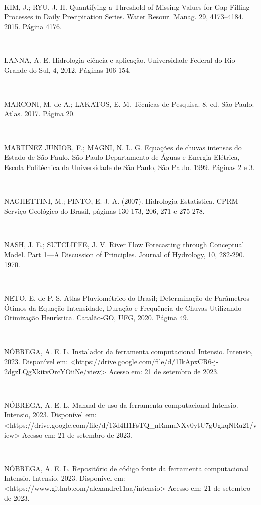 \begin{flushleft}
\

KIM, J.; RYU, J. H. Quantifying a Threshold of Missing Values for Gap Filling Processes in Daily Precipitation Series. Water Resour. Manag. 29, 4173–4184. 2015. Página 4176.

\

LANNA, A. E. Hidrologia ciência e aplicação. Universidade Federal do Rio Grande do Sul, 4, 2012. Páginas 106-154.

\

MARCONI, M. de A.; LAKATOS, E. M. Técnicas de Pesquisa. 8. ed. São Paulo: Atlas. 2017. Página 20.

\

MARTINEZ JUNIOR, F.; MAGNI, N. L. G. Equações de chuvas intensas do Estado de São Paulo. São Paulo Departamento de Águas e Energia Elétrica, Escola Politécnica da Universidade de São Paulo, São Paulo. 1999. Páginas 2 e 3.

\

NAGHETTINI, M.; PINTO, E. J. A. (2007). Hidrologia Estatística. CPRM – Serviço Geológico do Brasil, páginas 130-173, 206, 271 e 275-278.

\

NASH, J. E.; SUTCLIFFE, J. V. River Flow Forecasting through Conceptual Model. Part 1—A Discussion of Principles. Journal of Hydrology, 10, 282-290. 1970.

\

NETO, E. de P. S. Atlas Pluviométrico do Brasil; Determinação de Parâmetros Ótimos da Equação Intensidade, Duração e Frequência de Chuvas Utilizando Otimização Heurística. Catalão-GO, UFG, 2020. Página 49.

\newpage

\

NÓBREGA, A. E. L. Instalador da ferramenta computacional Intensio. Intensio, 2023. Disponível em: <https://drive.google.com/file/d/1IkApxCR6-j-2dgzLQgXkitvOrcYOiiNe/view> Acesso em: 21 de setembro de 2023.

\

NÓBREGA, A. E. L. Manual de uso da ferramenta computacional Intensio. Intensio, 2023. Disponível em: <https://drive.google.com/file/d/13d4H1FsTQ\_nRmmNXv0ytU7gUgkqNRu21/view> Acesso em: 21 de setembro de 2023.

\

NÓBREGA, A. E. L. Repositório de código fonte da ferramenta computacional Intensio. Intensio, 2023. Disponível em: <https://www.github.com/alexandre11aa/intensio> Acesso em: 21 de setembro de 2023.


\end{flushleft}
